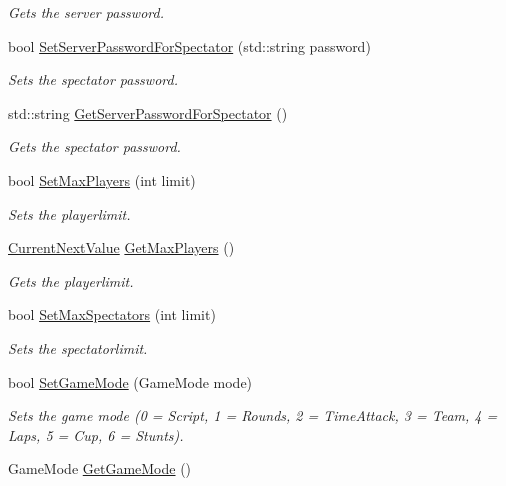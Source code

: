 \begin{DoxyCompactItemize}
\begin{DoxyCompactList}\small\item\em Gets the server password. \end{DoxyCompactList}\item 
bool \hyperlink{classMethods_a7db5e1f09b0cc5e8277ee0d3ec357079}{Set\-Server\-Password\-For\-Spectator} (std\-::string password)
\begin{DoxyCompactList}\small\item\em Sets the spectator password. \end{DoxyCompactList}\item 
\hypertarget{classMethods_a2b23248dc7bf7ddbc451f826d44451b8}{std\-::string \hyperlink{classMethods_a2b23248dc7bf7ddbc451f826d44451b8}{Get\-Server\-Password\-For\-Spectator} ()}\label{classMethods_a2b23248dc7bf7ddbc451f826d44451b8}

\begin{DoxyCompactList}\small\item\em Gets the spectator password. \end{DoxyCompactList}\item 
bool \hyperlink{classMethods_a3bb5185161cf4d1076743e3f187a5c12}{Set\-Max\-Players} (int limit)
\begin{DoxyCompactList}\small\item\em Sets the playerlimit. \end{DoxyCompactList}\item 
\hypertarget{classMethods_ab9406a1962b9c0c64046ee672010fd91}{\hyperlink{structCurrentNextValue}{Current\-Next\-Value} \hyperlink{classMethods_ab9406a1962b9c0c64046ee672010fd91}{Get\-Max\-Players} ()}\label{classMethods_ab9406a1962b9c0c64046ee672010fd91}

\begin{DoxyCompactList}\small\item\em Gets the playerlimit. \end{DoxyCompactList}\item 
bool \hyperlink{classMethods_a6d62a9089c8224eab05d89e040e2b646}{Set\-Max\-Spectators} (int limit)
\begin{DoxyCompactList}\small\item\em Sets the spectatorlimit. \end{DoxyCompactList}\item 
bool \hyperlink{classMethods_aa4864378a281beca161604bac6404241}{Set\-Game\-Mode} (Game\-Mode mode)
\begin{DoxyCompactList}\small\item\em Sets the game mode (0 = Script, 1 = Rounds, 2 = Time\-Attack, 3 = Team, 4 = Laps, 5 = Cup, 6 = Stunts). \end{DoxyCompactList}\item 
\hypertarget{classMethods_a406444bf2ce093f29d96cca5230d1d7a}{Game\-Mode \hyperlink{classMethods_a406444bf2ce093f29d96cca5230d1d7a}{Get\-Game\-Mode} ()}\label{classMethods_a406444bf2ce093f29d96cca5230d1d7a}


\end{DoxyCompactItemize}

